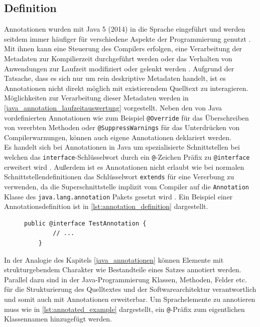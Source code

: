\subsection{Definition}
\label{java_annotationen_definition}
\noindent Annotationen wurden mit Java 5 (2014) in die Sprache eingeführt und werden seitdem immer häufiger für verschiedene Aspekte der Programmierung genutzt \cite{Rocha2011}. Mit ihnen kann eine Steuerung des Compilers erfolgen, eine Verarbeitung der Metadaten zur Kompilierzeit durchgeführt werden oder das Verhalten von Anwendungen zur Laufzeit modifiziert oder gelenkt werden \cite{Yu2019}. Aufgrund der Tatsache, dass es sich nur um rein deskriptive Metadaten handelt, ist es Annotationen nicht direkt möglich mit existierendem Quelltext zu interagieren.  Möglichkeiten zur Verarbeitung dieser Metadaten werden in \autoref{java_annotation_laufzeitauswertung} vorgestellt. Neben den von Java vordefinierten Annotationen wie zum Beispiel \texttt{@Override} für das Überschreiben von vererbten Methoden oder \texttt{@SuppressWarnings} für das Unterdrücken von Compilerwarnungen, können auch eigene Annotationen deklariert werden.\\
Es handelt sich bei Annotationen in Java um spezialisierte Schnittstellen bei welchen das \texttt{interface}-Schlüsselwort durch ein \texttt{@}-Zeichen Präfix zu \texttt{@interface} erweitert wird \cite{Gosling2005}. Außerdem ist es Annotationen nicht erlaubt wie bei normalen Schnittstellendefinitionen das Schlüsselwort \texttt{extends} für eine Vererbung zu verwenden, da die Superschnittstelle implizit vom Compiler auf die \texttt{Annotation} Klasse des \texttt{java.lang.annotation} Pakets gesetzt wird \cite{Oracle2017}. Ein Beispiel einer  Annotationsdefinition ist in \autoref{lst:annotation_definition} dargestellt.
\begin{figure}[H]
	\centering
	\begin{lstlisting}[caption={Beispiel einer Annotationsdefinition}, captionpos=b, label=lst:annotation_definition]
	public @interface TestAnnotation {
	    // ...
	}
	\end{lstlisting}
\end{figure}
\noindent In der Analogie des Kapitels \ref{java_annotationen} können Elemente mit strukturgebendem Charakter wie Bestandteile eines Satzes annotiert werden. Parallel dazu sind in der Java-Programmierung Klassen, Methoden, Felder etc. für die Strukturierung des Quelltextes und der Softwarearchitektur verantwortlich und somit auch mit Annotationen erweiterbar. Um Sprachelemente zu annotieren muss wie in \autoref{lst:annotated_example} dargestellt, ein \texttt{@}-Präfix zum eigentlichen Klassennamen hinzugefügt werden.
